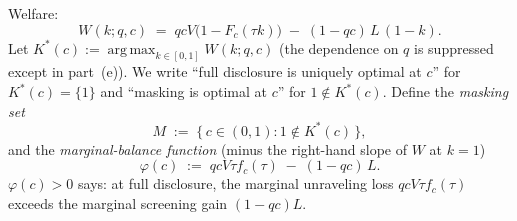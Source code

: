 Welfare:
\begin{equation}
W(k; q, c) \;=\; qcV\bigl(1 - F_c(\tau k)\bigr) \;-\; (1 - qc)\,L\,(1 - k).
\tag{W}\label{eq:W-app}
\end{equation}
Let $K^*(c) := \operatorname*{arg\,max}_{k \in [0,1]} W(k; q, c)$ (the dependence on
$q$ is suppressed except in part~(e)). We write ``full disclosure is uniquely optimal
at $c$'' for $K^*(c) = \{1\}$ and ``masking is optimal at $c$'' for $1 \notin K^*(c)$.
Define the \emph{masking set}
\[
M \;:=\; \{\, c \in (0,1) : 1 \notin K^*(c) \,\},
\]
and the \emph{marginal-balance function} (minus the right-hand slope of $W$ at $k = 1$)
\begin{equation}
\varphi(c) \;:=\; qcV\tau f_c(\tau) \;-\; (1 - qc)\,L.
\tag{$\varphi$}\label{eq:phi-app}
\end{equation}
$\varphi(c) > 0$ says: at full disclosure, the marginal unraveling loss
$qcV\tau f_c(\tau)$ exceeds the marginal screening gain $(1 - qc)L$.

